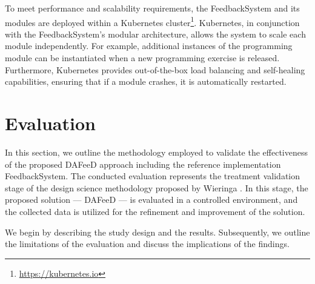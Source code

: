 \documentclass[manuscript,screen,review, anonymous]{acmart}
\begin{document}
To meet performance and scalability requirements, the FeedbackSystem and its modules are deployed within a Kubernetes cluster\footnote{\url{https://kubernetes.io}}.
Kubernetes, in conjunction with the FeedbackSystem's modular architecture, allows the system to scale each module independently.
For example, additional instances of the programming module can be instantiated when a new programming exercise is released.
Furthermore, Kubernetes provides out-of-the-box load balancing and self-healing capabilities, ensuring that if a module crashes, it is automatically restarted.

\section{Evaluation} %
\label{sec:evaluation}

In this section, we outline the methodology employed to validate the effectiveness of the proposed DAFeeD approach including the reference implementation FeedbackSystem.
The conducted evaluation represents the treatment validation stage of the design science methodology proposed by Wieringa \cite{wieringa:2014:DesignScienceMethodologya}.
In this stage, the proposed solution — DAFeeD — is evaluated in a controlled environment, and the collected data is utilized for the refinement and improvement of the solution.

We begin by describing the study design and the results.
Subsequently, we outline the limitations of the evaluation and discuss the implications of the findings.




\end{document}

